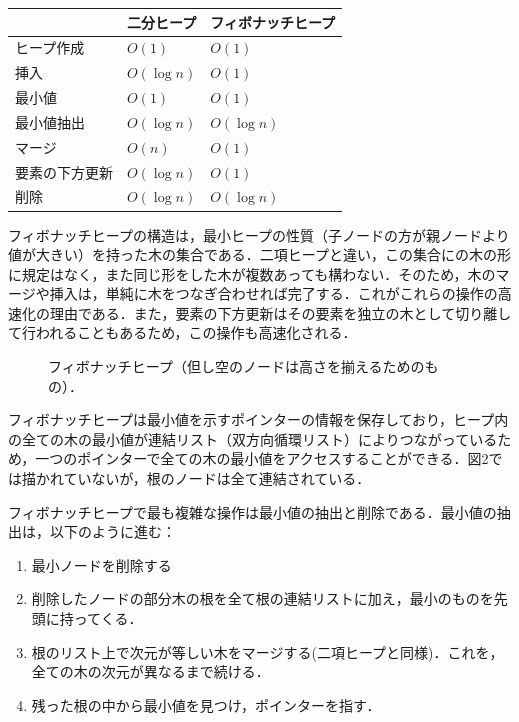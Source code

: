 \documentclass[
]{ltjarticle}
\begin{document}
\begin{longtable}[]{@{}lll@{}}
\toprule
& 二分ヒープ & フィボナッチヒープ\tabularnewline
\midrule
\endhead
ヒープ作成 & \(O(1)\) & \(O(1)\)\tabularnewline
挿入 & \(O(\log n)\) & \(O(1)\)\tabularnewline
最小値 & \(O(1)\) & \(O(1)\)\tabularnewline
最小値抽出 & \(O(\log n)\) & \(O(\log n)\)\tabularnewline
マージ & \(O(n)\) & \(O(1)\)\tabularnewline
要素の下方更新 & \(O(\log n)\) & \(O(1)\)\tabularnewline
削除 & \(O(\log n)\) & \(O(\log n)\)\tabularnewline
\bottomrule
\end{longtable}

フィボナッチヒープの構造は，最小ヒープの性質（子ノードの方が親ノードより値が大きい）を持った木の集合である．二項ヒープと違い，この集合にの木の形に規定はなく，また同じ形をした木が複数あっても構わない．そのため，木のマージや挿入は，単純に木をつなぎ合わせれば完了する．これがこれらの操作の高速化の理由である．また，要素の下方更新はその要素を独立の木として切り離して行われることもあるため，この操作も高速化される．

\begin{figure}
\centering
{}
\caption{フィボナッチヒープ（但し空のノードは高さを揃えるためのもの）．}
\end{figure}

フィボナッチヒープは最小値を示すポインターの情報を保存しており，ヒープ内の全ての木の最小値が連結リスト（双方向循環リスト）によりつながっているため，一つのポインターで全ての木の最小値をアクセスすることができる．図2では描かれていないが，根のノードは全て連結されている．

フィボナッチヒープで最も複雑な操作は最小値の抽出と削除である．最小値の抽出は，以下のように進む：\\

\begin{enumerate}
\item 最小ノードを削除する  
\item 削除したノードの部分木の根を全て根の連結リストに加え，最小のものを先頭に持ってくる．
\item 根のリスト上で次元が等しい木をマージする(二項ヒープと同様)．これを，全ての木の次元が異なるまで続ける．  
\item 残った根の中から最小値を見つけ，ポインターを指す． 
\end{enumerate}
\end{document}

